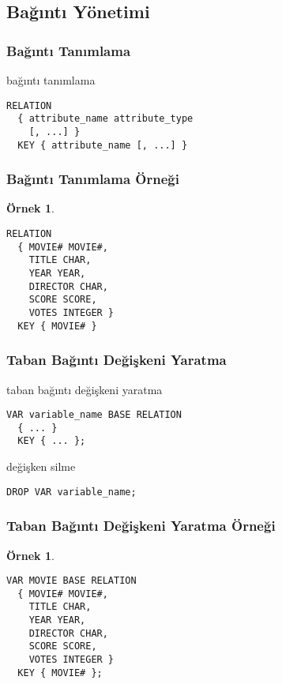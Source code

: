 \documentclass[dvipsnames]{beamer}
\theoremstyle{definition}
\theoremstyle{example}
\newtheorem{ornek}[theorem]{Örnek}
\theoremstyle{plain}
\begin{document}
\subsection{Bağıntı Yönetimi}

\begin{frame}[fragile]
  \frametitle{Bağıntı Tanımlama}

  \begin{block}{bağıntı tanımlama}
    \begin{lstlisting}
RELATION
  { attribute_name attribute_type
    [, ...] }
  KEY { attribute_name [, ...] }
    \end{lstlisting}
  \end{block}
\end{frame}

\begin{frame}[fragile]
  \frametitle{Bağıntı Tanımlama Örneği}

  \begin{ornek}
    \begin{lstlisting}
RELATION
  { MOVIE# MOVIE#,
    TITLE CHAR,
    YEAR YEAR,
    DIRECTOR CHAR,
    SCORE SCORE,
    VOTES INTEGER }
  KEY { MOVIE# }
    \end{lstlisting}
  \end{ornek}
\end{frame}

\begin{frame}[fragile]
  \frametitle{Taban Bağıntı Değişkeni Yaratma}

  \begin{block}{taban bağıntı değişkeni yaratma}
    \begin{lstlisting}
VAR variable_name BASE RELATION
  { ... }
  KEY { ... };
    \end{lstlisting}
  \end{block}

  \pause
  \begin{block}{değişken silme}
    \begin{lstlisting}
DROP VAR variable_name;
    \end{lstlisting}
  \end{block}
\end{frame}

\begin{frame}[fragile]
  \frametitle{Taban Bağıntı Değişkeni Yaratma Örneği}

  \begin{ornek}
    \begin{lstlisting}
VAR MOVIE BASE RELATION
  { MOVIE# MOVIE#,
    TITLE CHAR,
    YEAR YEAR,
    DIRECTOR CHAR,
    SCORE SCORE,
    VOTES INTEGER }
  KEY { MOVIE# };
    \end{lstlisting}
  \end{ornek}
\end{frame}
\end{document}
